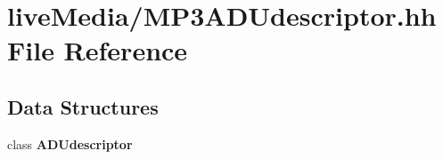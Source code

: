 \section{live\+Media/\+M\+P3\+A\+D\+Udescriptor.hh File Reference}
\label{MP3ADUdescriptor_8hh}
\subsection*{Data Structures}
\begin{DoxyCompactItemize}
\item 
class {\bf A\+D\+Udescriptor}
\end{DoxyCompactItemize}
